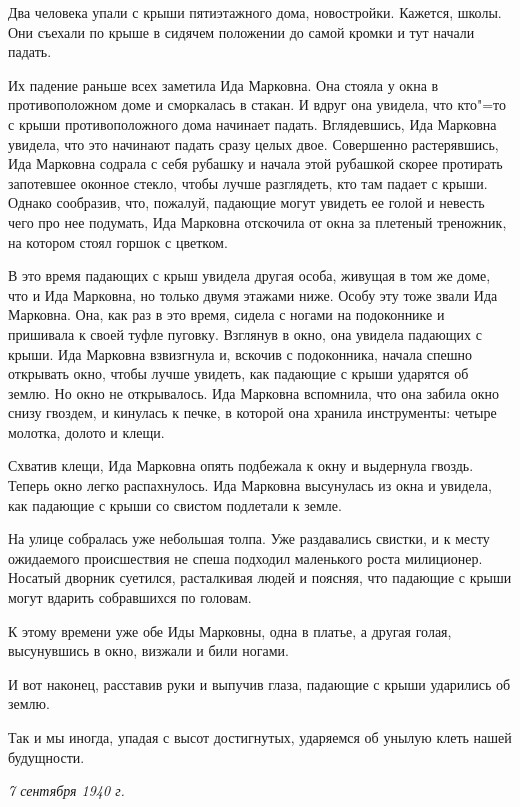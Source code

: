 Два человека упали с крыши пятиэтажного дома, новостройки. Кажется, школы. Они съехали по крыше в сидячем положении до самой кромки и тут начали падать.

Их падение раньше всех заметила Ида Марковна. Она стояла у окна в противоположном доме и сморкалась в стакан. И вдруг она увидела, что кто"=то с крыши противоположного дома начинает падать. Вглядевшись, Ида Марковна увидела, что это начинают падать сразу целых двое. Совершенно растерявшись, Ида Марковна содрала с себя рубашку и начала этой рубашкой скорее протирать запотевшее оконное стекло, чтобы лучше разглядеть, кто там падает с крыши. Однако сообразив, что, пожалуй, падающие могут увидеть ее голой и невесть чего про нее подумать, Ида Марковна отскочила от окна за плетеный треножник, на котором стоял горшок с цветком.

В это время падающих с крыш увидела другая особа, живущая в том же доме, что и Ида Марковна, но только двумя этажами ниже. Особу эту тоже звали Ида Марковна. Она, как раз в это время, сидела с ногами на подоконнике и пришивала к своей туфле пуговку. Взглянув в окно, она увидела падающих с крыши. Ида Марковна взвизгнула и, вскочив с подоконника, начала спешно открывать окно, чтобы лучше увидеть, как падающие с крыши ударятся об землю. Но окно не открывалось. Ида Марковна вспомнила, что она забила окно снизу гвоздем, и кинулась к печке, в которой она хранила инструменты: четыре молотка, долото и клещи.

Схватив клещи, Ида Марковна опять подбежала к окну и выдернула гвоздь. Теперь окно легко распахнулось. Ида Марковна высунулась из окна и увидела, как падающие с крыши со свистом подлетали к земле.

На улице собралась уже небольшая толпа. Уже раздавались свистки, и к месту ожидаемого происшествия не спеша подходил маленького роста милиционер. Носатый дворник суетился, расталкивая людей и поясняя, что падающие с крыши могут вдарить собравшихся по головам.

К этому времени уже обе Иды Марковны, одна в платье, а другая голая, высунувшись в окно, визжали и били ногами.

И вот наконец, расставив руки и выпучив глаза, падающие с крыши ударились об землю.

Так и мы иногда, упадая с высот достигнутых, ударяемся об унылую клеть нашей будущности.

\medskip
\noindent\textit{7 сентября 1940 г.}
